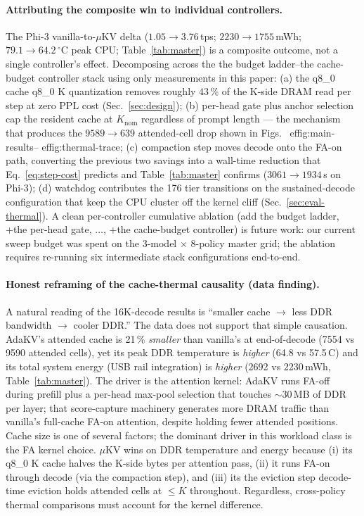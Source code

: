 \documentclass[sigconf, anonymous=false, screen=true]{acmart}
\begin{document}
\paragraph{Attributing the composite win to individual controllers.} The Phi-3 vanilla-to-$\mu$KV delta ($1.05 \to 3.76$\,tps; $2230 \to 1755$\,mWh; $79.1 \to 64.2\,^\circ$C peak CPU; Table~\ref{tab:master}) is a composite outcome, not a single controller's effect. Decomposing across the the budget ladder--the cache-budget controller stack using only measurements in this paper: (a) the q8\_0 cache q8\_0 K quantization removes roughly $43\,\%$ of the K-side DRAM read per step at zero PPL cost (Sec.~\ref{sec:design}); (b) per-head gate plus anchor selection cap the resident cache at $K_\text{nom}$ regardless of prompt length --- the mechanism that produces the $9589 \to 639$ attended-cell drop shown in Figs.~
ef{fig:main-results}--
ef{fig:thermal-trace}; (c) compaction step moves decode onto the FA-on path, converting the previous two savings into a wall-time reduction that Eq.~\eqref{eq:step-cost} predicts and Table~\ref{tab:master} confirms ($3061 \to 1934$\,s on Phi-3); (d) watchdog contributes the 176 tier transitions on the sustained-decode configuration that keep the CPU cluster off the kernel cliff (Sec.~\ref{sec:eval-thermal}). A clean per-controller cumulative ablation (add the budget ladder, +the per-head gate, $\ldots$, +the cache-budget controller) is future work: our current sweep budget was spent on the 3-model $\times$ 8-policy master grid; the ablation requires re-running six intermediate stack configurations end-to-end.


\paragraph{Honest reframing of the cache-thermal causality (data finding).} A natural reading of the 16K-decode results is ``smaller cache $\to$ less DDR bandwidth $\to$ cooler DDR.'' The data does not support that simple causation. AdaKV's attended cache is 21\,\% \emph{smaller} than vanilla's at end-of-decode (7554 vs 9590 attended cells), yet its peak DDR temperature is \emph{higher} (64.8 vs 57.5\,\textdegree C) and its total system energy (USB rail integration) is \emph{higher} (2692 vs 2230\,mWh, Table~\ref{tab:master}). The driver is the attention kernel: AdaKV runs FA-off during prefill plus a per-head max-pool selection that touches $\sim$30\,MB of DDR per layer; that score-capture machinery generates more DRAM traffic than vanilla's full-cache FA-on attention, despite holding fewer attended positions. Cache size is one of several factors; the dominant driver in this workload class is the FA kernel choice. $\mu$KV wins on DDR temperature and energy because (i) its q8\_0 K cache halves the K-side bytes per attention pass, (ii) it runs FA-on through decode (via the compaction step), and (iii) its the eviction step decode-time eviction holds attended cells at $\le K$ throughout. Regardless, cross-policy thermal comparisons must account for the kernel difference.
\end{document}
